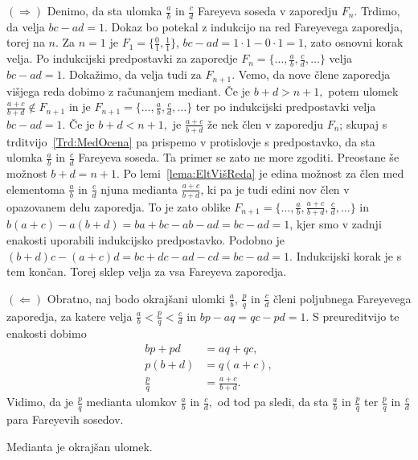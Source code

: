\documentclass[mat1]{fmfdelo}
\begin{document}
\begin{dokaz}
$(\Rightarrow)$ Denimo, da sta ulomka $\frac{a}{b}$ in $\frac{c}{d}$ Fareyeva soseda v zaporedju $F_{n}$. Trdimo, da velja $bc - ad = 1$. Dokaz bo potekal z indukcijo na red Fareyevega zaporedja, torej na $n$.
Za $n=1$ je $F_1 = \{\frac{0}{1}, \frac{1}{1}\}$, $bc - ad = 1\cdot1 - 0\cdot1 = 1$, zato osnovni korak velja.
Po indukcijski predpostavki za zaporedje \( F_n = \{\ldots , \frac{a}{b}, \frac{c}{d} , \ldots \} \) velja $bc - ad = 1$. Dokažimo, da velja tudi za $F_{n+1}$. Vemo, da nove člene zaporedja višjega reda dobimo z računanjem mediant. Če je $b+d > n+1,$ potem ulomek $\frac{a+c}{b+d} \notin F_{n+1}$ in je \( F_{n+1} = \{\ldots , \frac{a}{b}, \frac{c}{d} , \ldots \} \) ter po indukcijski predpostavki velja $bc - ad = 1$. 
Če je $b+d < n+1,$ je $\frac{a+c}{b+d}$ že nek člen v zaporedju $F_n$; skupaj s trditvijo~\ref{Trd:MedOcena} pa prispemo v protislovje s predpostavko, da sta ulomka $\frac{a}{b}$ in $\frac{c}{d}$ Fareyeva soseda. Ta primer se zato ne more zgoditi. 
Preostane še možnost $b+d = n+1$. Po lemi~\ref{lema:EltVišReda} je edina možnost za člen med elementoma $\frac{a}{b}$ in $\frac{c}{d}$ njuna medianta $\frac{a+c}{b+d}$, ki pa je tudi edini nov člen v opazovanem delu zaporedja. To je zato oblike \( F_{n+1} = \{\ldots , \frac{a}{b}, \frac{a+c}{b+d}, \frac{c}{d} , \ldots \} \) in $b(a + c) - a(b + d) = ba + bc - ab - ad = bc - ad = 1$, kjer smo v zadnji enakosti uporabili indukcijsko predpostavko. Podobno je $(b + d)c - (a + c)d = bc + dc - ad - cd = bc - ad = 1$. Indukcijski korak je s tem končan. Torej sklep velja za vsa Fareyeva zaporedja.

$(\Leftarrow)$ Obratno, naj bodo okrajšani ulomki $\frac{a}{b}$, $\frac{p}{q}$ in $\frac{c}{d}$ členi poljubnega Fareyevega zaporedja, za katere velja $\frac{a}{b} <\frac{p}{q} < \frac{c}{d}$ in $bp - aq = qc - pd = 1$. S preureditvijo te enakosti dobimo
\begin{align*}
bp + pd &= aq + qc, \\
p(b + d) &= q(a + c), \\
\frac{p}{q} &= \frac{a+c}{b+d}.
\end{align*}
Vidimo, da je $\frac{p}{q}$ medianta ulomkov $\frac{a}{b}$ in $\frac{c}{d},$ od tod pa sledi, da sta $\frac{a}{b}$ in $\frac{p}{q}$ ter $\frac{p}{q}$ in $\frac{c}{d}$ para Fareyevih sosedov.
\end{dokaz}

\begin{lema}
\label{lema:MediantaOkrUlom}
Medianta je okrajšan ulomek.
\end{lema}
\end{document}
